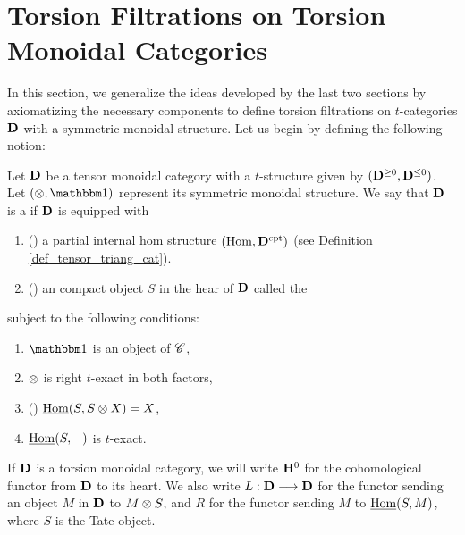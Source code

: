 \newpage
\chapter{Torsion Filtrations on Torsion Monoidal Categories}
\label{sect_filtration_general}

In this section, we generalize the ideas developed by the last
two sections by axiomatizing the necessary components to define
torsion filtrations on $t$-categories $\mathbf{D}$ with a symmetric
monoidal structure. Let us begin by defining the following notion:

\begin{defn}\label{def_torsion_monoidal_category}
Let $\mathbf{D}$ be a tensor monoidal category with a $t$-structure 
given by $(\mathbf{D}^{\geq 0}, \mathbf{D}^{\leq 0})$. Let 
$(\tensor, \Unit)$ represent its symmetric monoidal structure. We 
say that $\mathbf{D}$ is a  if $\mathbf{D}$ 
is equipped with 
\begin{enumerate}
\item () a partial internal hom
structure $(\underline{\mathrm{Hom}}, \mathbf{D}^{\mathrm{cpt}})$ (see Definition
\ref{def_tensor_triang_cat}).

\item () an compact object $S$ in the hear
   of $\mathbf{D}$ called the 
\end{enumerate}

\noindent subject to the following conditions:

\begin{enumerate}
\item $\Unit$ is an object of $\mathscr{C}$,

\item $\otimes$ is right $t$-exact in both factors,

\item () $\underline{\mathrm{Hom}}(S, S \otimes X) = X$,

\item $\underline{\mathrm{Hom}}(S, -)$ is $t$-exact.
\end{enumerate}
\end{defn}

If $\mathbf{D}$ is a torsion monoidal category, we will write $\mathbf{H}^0$
for the cohomological functor from $\mathbf{D}$ to its heart. We also 
write $L: \mathbf{D} \longrightarrow \mathbf{D}$ for the functor sending an object $M$ 
in $\mathbf{D}$ to $M \otimes S$, and $R$ for the functor sending $M$
to $\underline{\mathrm{Hom}}(S, M)$, where $S$ is the Tate object. 

